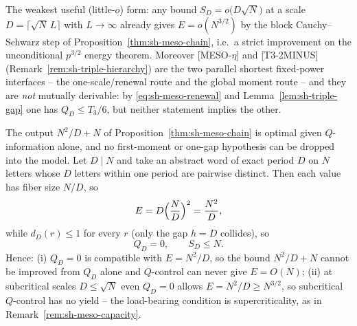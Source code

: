 \begin{remark}\label{rem:sh-meso-variants}
The weakest useful (little-$o$) form: any bound
$S_D=o\bigl(D\sqrt N\bigr)$ at a scale $D=\lceil\sqrt N\,L\rceil$
with $L\to\infty$ already gives $E=o(N^{3/2})$ by the block
Cauchy--Schwarz step of Proposition~\ref{thm:sh-meso-chain}, i.e.\ a
strict improvement on the unconditional $p^{3/2}$ energy theorem.
Moreover [MESO-$\eta$] and [T3-2MINUS]
(Remark~\ref{rem:sh-triple-hierarchy}) are the two parallel shortest
fixed-power interfaces -- the one-scale/renewal route and the global
moment route -- and they are \emph{not} mutually derivable: by
\eqref{eq:sh-meso-renewal} and Lemma~\ref{lem:sh-triple-gap} one has
$Q_D\le T_3/6$, but neither statement implies the other.
\end{remark}

\begin{remark}
\label{rem:sh-meso-sharp}
The output $N^2/D+N$ of Proposition~\ref{thm:sh-meso-chain} is
optimal given $Q$-information alone, and no first-moment or one-gap
hypothesis can be dropped into the model.  Let $D\mid N$ and take an
abstract word of exact period $D$ on $N$ letters whose $D$ letters
within one period are pairwise distinct.  Then each value has fiber
size $N/D$, so
\[
 E=D\Bigl(\frac ND\Bigr)^{2}=\frac{N^2}{D},
\]
while $d_D(r)\le1$ for every $r$ (only the gap $h=D$ collides), so
\[
 Q_D=0,
 \qquad
 S_D\le N .
\]
Hence: (i) $Q_D=0$ is compatible with $E=N^2/D$, so the bound
$N^2/D+N$ cannot be improved from $Q_D$ alone and $Q$-control can
never give $E=O(N)$; (ii) at subcritical scales $D\le\sqrt N$ even
$Q_D=0$ allows $E=N^2/D\ge N^{3/2}$, so subcritical $Q$-control has
no yield -- the load-bearing condition is supercriticality, as in
Remark~\ref{rem:sh-meso-capacity}.
\end{remark}



